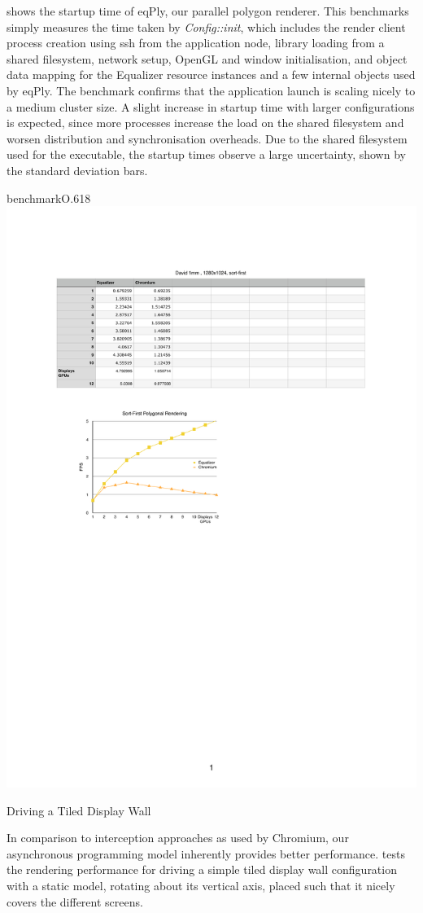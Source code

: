  shows the startup time of eqPly, our parallel polygon renderer.
This benchmarks simply measures the time taken by {\em Config::init}, which
includes the render client process creation using ssh from the application
node, library loading from a shared filesystem, network setup, OpenGL and
window initialisation, and object data mapping for the Equalizer resource
instances and a few internal objects used by eqPly. The benchmark confirms that
the application launch is scaling nicely to a medium cluster size. A slight
increase in startup time with larger configurations is expected, since more
processes increase the load on the shared filesystem and worsen distribution
and synchronisation overheads. Due to the shared filesystem used for the
executable, the startup times observe a large uncertainty, shown by the
standard deviation bars.

\begin{wrapfloat}{benchmark}{O}{.618\textwidth}
 \includegraphics[width=.618\textwidth]{results/cr}
 {\caption{\label{rCR}Driving a Tiled Display Wall}}
\end{wrapfloat}

In comparison to interception approaches as used by Chromium, our asynchronous
programming model inherently provides better performance.  tests
the rendering performance for driving a simple tiled display wall configuration
with a static model, rotating about its vertical axis, placed such that it
nicely covers the different screens.

